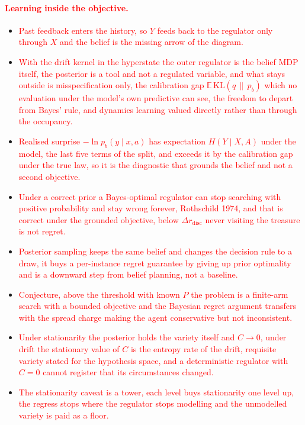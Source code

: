 \documentclass[10pt]{article}
\newcommand{\add}[1]{\textcolor{red}{#1}}
\begin{document}
\paragraph{\add{Learning inside the objective.}}
\begin{itemize}
  \item \add{Past feedback enters the history, so $Y$ feeds back to the regulator only through $X$ and the belief is the missing arrow of the diagram.}
  \item \add{With the drift kernel in the hyperstate the outer regulator is the belief MDP itself, the posterior is a tool and not a regulated variable, and what stays outside is misspecification only, the calibration gap $\mathbb E\,\mathrm{KL}(q \,\|\, p_b)$ which no evaluation under the model's own predictive can see, the freedom to depart from Bayes' rule, and dynamics learning valued directly rather than through the occupancy.}
  \item \add{Realised surprise $-\ln p_b(y \mid x,a)$ has expectation $H(Y \mid X,A)$ under the model, the last five terms of the split, and exceeds it by the calibration gap under the true law, so it is the diagnostic that grounds the belief and not a second objective.}
  \item \add{Under a correct prior a Bayes-optimal regulator can stop searching with positive probability and stay wrong forever, Rothschild 1974, and that is correct under the grounded objective, below $\Delta r_{\mathrm{disc}}$ never visiting the treasure is not regret.}
  \item \add{Posterior sampling keeps the same belief and changes the decision rule to a draw, it buys a per-instance regret guarantee by giving up prior optimality and is a downward step from belief planning, not a baseline.}
  \item \add{Conjecture, above the threshold with known $P$ the problem is a finite-arm search with a bounded objective and the Bayesian regret argument transfers with the spread charge making the agent conservative but not inconsistent.}
  \item \add{Under stationarity the posterior holds the variety itself and $C \to 0$, under drift the stationary value of $C$ is the entropy rate of the drift, requisite variety stated for the hypothesis space, and a deterministic regulator with $C = 0$ cannot register that its circumstances changed.}
  \item \add{The stationarity caveat is a tower, each level buys stationarity one level up, the regress stops where the regulator stops modelling and the unmodelled variety is paid as a floor.}
\end{itemize}
\end{document}
